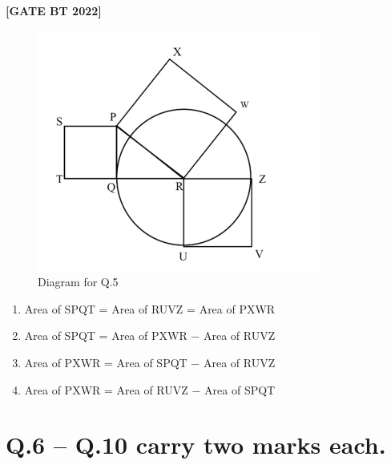 \documentclass[12pt]{article}
\begin{document}
\begin{enumerate}[leftmargin=2.5em, label=\textbf{Q.\arabic*}., itemsep=2em]
\noindent \textbf{[GATE BT 2022]}
\begin{figure}[H]\centering
\includegraphics[width=0.5\columnwidth]{figs/q5.png}
\caption{Diagram for Q.5}
\label{fig:q5}
\end{figure}
\begin{multicols}{2}
\begin{enumerate}
    \item Area of SPQT = Area of RUVZ = Area of PXWR
    \item Area of SPQT = Area of PXWR $-$ Area of RUVZ
    \item Area of PXWR = Area of SPQT $-$ Area of RUVZ
    \item Area of PXWR = Area of RUVZ $-$ Area of SPQT
\end{enumerate}
\end{multicols}

\end{enumerate}


\section*{Q.6 -- Q.10 carry two marks each.}
\end{document}
